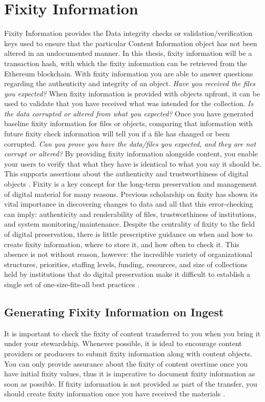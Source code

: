\section{Fixity Information}
Fixity Information provides the Data integrity checks or validation/verification keys used to ensure that the particular Content Information object has not been altered in an undocumented manner\cite[8]{lee2010open}. In this thesis, fixity information will be a transaction hash, with which the fixity information can be retrieved from the Ethereum blockchain.
With fixity information you are able to answer questions regarding the authenticity and integrity of an object.
\textit{Have you received the files you expected?} When fixity information is provided with objects upfront, it can be used to validate that you have received what was intended for the collection.
\textit{Is the data corrupted or altered from what you expected?}  Once you have generated baseline fixity information for files or objects, comparing that information with future fixity check information will tell you if a file has changed or been corrupted.
\textit{Can you prove you have the data/files you expected, and they are not corrupt or altered?} By providing fixity information alongside content, you enable your users to verify that what they have is identical to what you say it should be. This supports assertions about the authenticity and trustworthiness of digital objects \cite[3]{ndsa2017fixity}.
Fixity is a key concept for the long-term preservation and management of digital material for many reasons. Previous scholarship on fixity has shown its vital importance in discovering changes to data and all that this error-checking can imply: authenticity and renderability of files, trustworthiness of institutions, and system monitoring/maintenance. Despite the centrality of fixity to the field of digital preservation, there is little prescriptive guidance on when and how to create fixity information, where to store it, and how often to check it. This absence is not without reason, however: the incredible variety of organizational structures, priorities, staffing levels, funding, resources, and size of collections held by institutions that do digital preservation make it difficult to establish a single set of one-size-fits-all best practices \cite[38]{ndsa2017fixity}.
\subsection{Generating Fixity Information on Ingest}
 It is important to check the fixity
of content transferred to you when you bring it under your stewardship. Whenever possible, it is ideal to encourage content providers or producers to submit fixity information along with content objects. You can only provide assurance about the fixity of content overtime once you have initial fixity values, thus it is imperative to document fixity information as soon as possible. If fixity information is not provided as part of the transfer, you should create fixity information once you have received the materials \cite[4]{ndsa2014fixity}.
